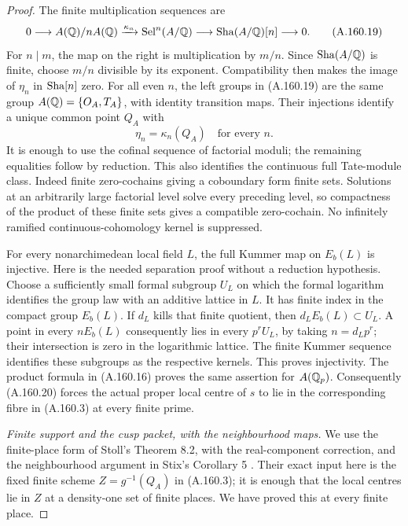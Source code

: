 \begin{proof}
The finite multiplication sequences are
\[
 0\longrightarrow A(\mathbb Q)/nA(\mathbb Q)
  \xrightarrow{\kappa_n}\operatorname{Sel}^n(A/\mathbb Q)
  \longrightarrow\operatorname{Sha}(A/\mathbb Q)[n]\longrightarrow0.
\tag{A.160.19}
\]
For \(n\mid m\), the map on the right is multiplication
by \(m/n\).  Since \(\operatorname{Sha}(A/\mathbb Q)\) is finite, choose
\(m/n\) divisible by its exponent.  Compatibility then
makes the image of \(\eta_n\) in \(\operatorname{Sha}[n]\) zero.
For all even \(n\), the left groups in (A.160.19) are
the same group \(A(\mathbb Q)=\{O_A,T_A\}\), with identity
transition maps.  Their injections identify a unique
common point \(Q_A\) with
\[
                         \eta_n=\kappa_n(Q_A)
                                    \quad\text{for every }n.
\tag{A.160.20}
\]
It is enough to use the cofinal sequence of factorial
moduli; the remaining equalities follow by reduction.
This also identifies the continuous full Tate-module
class.  Indeed finite zero-cochains giving a coboundary
form finite sets.  Solutions at an arbitrarily large
factorial level solve every preceding level, so compactness
of the product of these finite sets gives a compatible
zero-cochain.  No infinitely ramified continuous-cohomology
kernel is suppressed.

For every nonarchimedean local field \(L\), the full
Kummer map on \(E_b(L)\) is injective.  Here is the
needed separation proof without a reduction hypothesis.
Choose a sufficiently small formal subgroup \(U_L\)
on which the formal logarithm identifies the group law
with an additive lattice in \(L\).  It has finite index
in the compact group \(E_b(L)\).  If \(d_L\) kills
that finite quotient, then
\(d_LE_b(L)\subset U_L\).  A point in every
\(nE_b(L)\) consequently lies in every
\(p^rU_L\), by taking \(n=d_Lp^r\); their intersection
is zero in the logarithmic lattice.  The finite Kummer
sequence identifies these subgroups as the respective
kernels.  This proves injectivity.  The product formula
in (A.160.16) proves the same assertion for \(A(\mathbb Q_p)\).
Consequently (A.160.20) forces the actual proper local
centre of \(s\) to lie in the corresponding fibre in
(A.160.3) at every finite prime.

\emph{Finite support and the cusp packet, with the neighbourhood maps.}
We use the finite-place form of Stoll's Theorem 8.2,
with the real-component correction, and the neighbourhood
argument in Stix's Corollary 5
\cite[Theorem 8.2]{LegStoll2007}
\cite[\S3]{LegStollErrata2017}
\cite[Theorem 4 and proof of Corollary 5]{BIR_Stix2015}.
Their exact input here is the fixed finite scheme
\(Z=g^{-1}(Q_A)\) in (A.160.3); it is enough that the
local centres lie in \(Z\) at a density-one set of finite
places.  We have proved this at every finite place.


\end{proof}
